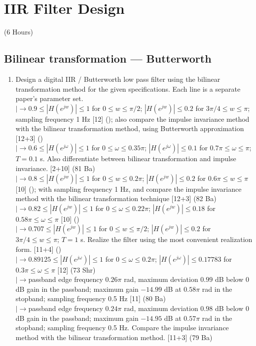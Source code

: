 \documentclass[12pt]{article}
\newcommand{\lb}{\\$\left|\rightarrow\right.$}
\begin{document}
\pagebreak
\section{IIR Filter Design}
\begin{center}(6 Hours)\end{center}

  \subsection{Bilinear transformation --- Butterworth}
    \begin{enumerate}[topsep=0pt, noitemsep]
      \item Design a digital IIR / Butterworth low pass filter using the bilinear transformation method for the given specifications. Each line is a separate paper's parameter set.
        \lb $0.9\le|H(e^{jw})|\le1$ for $0\le w\le\pi/2$; $|H(e^{jw})|\le0.2$ for $3\pi/4\le w\le\pi$; sampling frequency 1 Hz \hfill [12] (); also compare the impulse invariance method with the bilinear transformation method, using Butterworth approximation \hfill [12+3] ()
        \lb $0.6\le|H(e^{j\omega})|\le1$ for $0\le\omega\le0.35\pi$; $|H(e^{j\omega})|\le0.1$ for $0.7\pi\le\omega\le\pi$; $T=0.1$ s. Also differentiate between bilinear transformation and impulse invariance. \hfill [2+10] (81 Ba)
        \lb $0.8\le|H(e^{jw})|\le1$ for $0\le w\le0.2\pi$; $|H(e^{jw})|\le0.2$ for $0.6\pi\le w\le\pi$ \hfill [10] (); with sampling frequency 1 Hz, and compare the impulse invariance method with the bilinear transformation technique \hfill [12+3] (82 Ba)
        \lb $0.82\le|H(e^{jw})|\le1$ for $0\le\omega\le0.22\pi$; $|H(e^{jw})|\le0.18$ for $0.58\pi\le\omega\le\pi$ \hfill [10] ()
        \lb $0.707\le|H(e^{jw})|\le1$ for $0\le w\le\pi/2$; $|H(e^{jw})|\le0.2$ for $3\pi/4\le w\le\pi$; $T=1$ s. Realize the filter using the most convenient realization form. \hfill [11+4] ()
        \lb $0.89125\le|H(e^{j\omega})|\le1$ for $0\le\omega\le0.2\pi$; $|H(e^{j\omega})|\le0.17783$ for $0.3\pi\le\omega\le\pi$ \hfill [12] (73 Shr)
        \lb passband edge frequency $0.26\pi$ rad, maximum deviation $0.99$ dB below 0 dB gain in the passband; maximum gain $-14.99$ dB at $0.58\pi$ rad in the stopband; sampling frequency 0.5 Hz \hfill [11] (80 Ba)
        \lb passband edge frequency $0.24\pi$ rad, maximum deviation $0.98$ dB below 0 dB gain in the passband; maximum gain $-14.95$ dB at $0.57\pi$ rad in the stopband; sampling frequency 0.5 Hz. Compare the impulse invariance method with the bilinear transformation method. \hfill [11+3] (79 Ba)

\end{enumerate}
\end{document}

